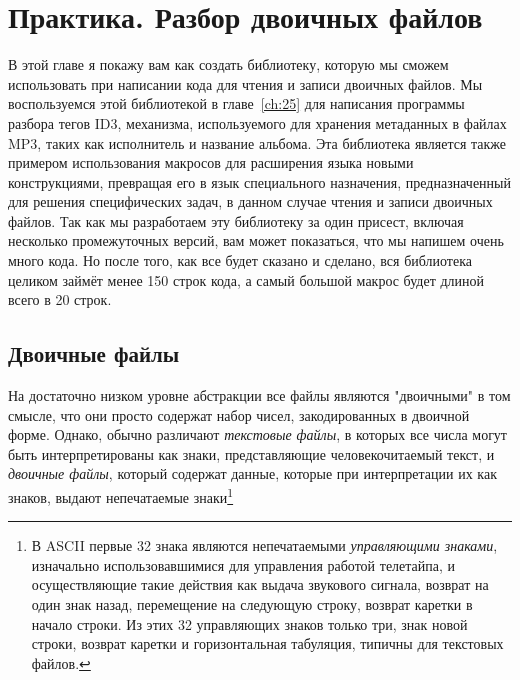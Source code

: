 
\chapter{Практика. Разбор двоичных файлов}
\label{ch:24}

В этой главе я покажу вам как создать библиотеку, которую мы сможем использовать при
написании кода для чтения и записи двоичных файлов. Мы воспользуемся этой библиотекой в
главе~\ref{ch:25} для написания программы разбора тегов ID3, механизма, используемого для
хранения метаданных в файлах MP3, таких как исполнитель и название альбома. Эта библиотека
является также примером использования макросов для расширения языка новыми конструкциями,
превращая его в язык специального назначения, предназначенный для решения специфических
задач, в данном случае чтения и записи двоичных файлов. Так как мы разработаем эту
библиотеку за один присест, включая несколько промежуточных версий, вам может показаться,
что мы напишем очень много кода. Но после того, как все будет сказано и сделано, вся
библиотека целиком займёт менее 150 строк кода, а самый большой макрос будет длиной всего
в 20 строк.

\section{Двоичные файлы}

На достаточно низком уровне абстракции все файлы являются "двоичными" в том смысле, что
они просто содержат набор чисел, закодированных в двоичной форме.  Однако, обычно
различают \textit{текстовые файлы}, в которых все числа могут быть интерпретированы как
знаки, представляющие человекочитаемый текст, и \textit{двоичные файлы}, который содержат
данные, которые при интерпретации их как знаков, выдают непечатаемые знаки\footnote{В
  ASCII первые 32 знака являются непечатаемыми \textit{управляющими знаками}, изначально
  использовавшимися для управления работой телетайпа, и осуществляющие такие действия как
  выдача звукового сигнала, возврат на один знак назад, перемещение на следующую строку,
  возврат каретки в начало строки. Из этих 32 управляющих знаков только три, знак новой
  строки, возврат каретки и горизонтальная табуляция, типичны для текстовых файлов.}

